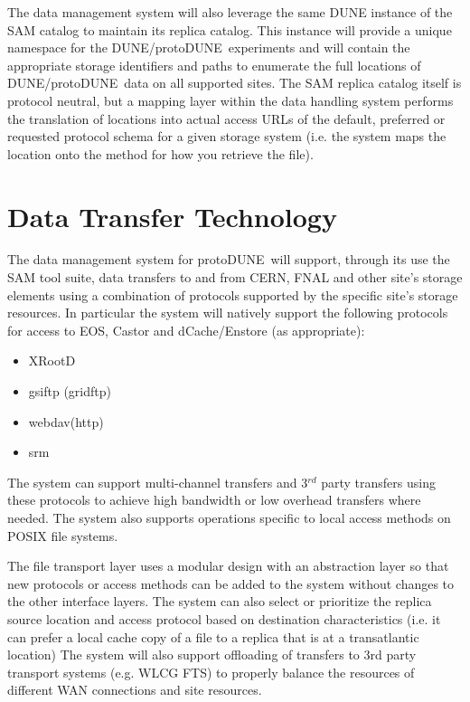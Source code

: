 \documentclass[pdftex,12pt,letter]{article}
\newcommand{\pd}{protoDUNE\ }
\begin{document}
The data management system will also leverage the same DUNE instance of the SAM catalog to maintain its
replica catalog.  This instance will provide a unique namespace for the DUNE/\pd experiments and will
contain the appropriate storage identifiers and paths to enumerate the full locations of  DUNE/\pd data
on all supported sites.  The SAM replica catalog itself is protocol neutral, but a mapping layer within the
data handling system performs the translation of locations into actual access URLs of the default, preferred
or requested protocol schema for a given storage system (i.e. the system maps the location onto the method
for how you retrieve the file).

\section{Data Transfer Technology}

The data management system for \pd will support, through its use the SAM tool suite,  data transfers to and from CERN,
FNAL and other site’s storage elements using a combination of protocols supported by the specific site's storage resources.
In particular the system will natively support the following protocols for access to EOS, Castor and dCache/Enstore (as appropriate):
\begin{itemize}
\item XRootD
\item gsiftp (gridftp)
\item webdav(http)
\item srm
\end{itemize}

\noindent The system can support multi-channel transfers and 3$^{rd}$ party transfers
using these protocols to achieve high bandwidth or low overhead transfers where needed.  The system also supports operations
specific to local access methods on POSIX file systems.  

The file transport layer uses a modular design with an abstraction layer so that new protocols or access methods can be added to the system without changes to the other interface layers.  The system can also select or prioritize the replica source location and access protocol based on destination characteristics (i.e. it can prefer a local cache copy of a file to a replica that is at a transatlantic location)  The system will also support offloading of transfers to 3rd party transport systems (e.g. WLCG FTS) to properly balance the resources of different WAN connections and site resources.
\end{document}

